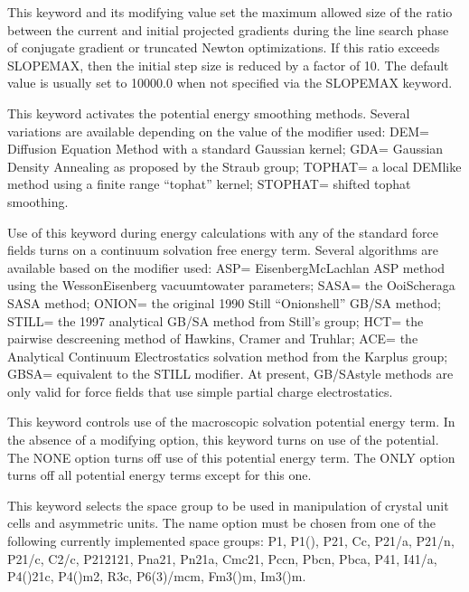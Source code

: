\documentclass[letterpaper,11pt,english]{sphinxmanual}
\begin{document}
  This keyword and its modifying value set the maximum allowed size of the ratio between the current and initial projected gradients during the line search phase of conjugate gradient or truncated Newton optimizations. If this ratio exceeds SLOPEMAX, then the initial step size is reduced by a factor of 10. The default value is usually set to 10000.0 when not specified via the SLOPEMAX keyword.

  This keyword activates the potential energy smoothing methods. Several variations are available depending on the value of the modifier used: DEM= Diffusion Equation Method with a standard Gaussian kernel; GDA= Gaussian Density Annealing as proposed by the Straub group; TOPHAT= a local DEM\sphinxhyphen{}like method using a finite range “tophat” kernel; STOPHAT= shifted tophat smoothing.

  Use of this keyword during energy calculations with any of the standard force fields turns on a continuum solvation free energy term. Several algorithms are available based on the modifier used: ASP= Eisenberg\sphinxhyphen{}McLachlan ASP method using the Wesson\sphinxhyphen{}Eisenberg vacuum\sphinxhyphen{}to\sphinxhyphen{}water parameters; SASA= the Ooi\sphinxhyphen{}Scheraga SASA method; ONION= the original 1990 Still “Onion\sphinxhyphen{}shell” GB/SA method; STILL= the 1997 analytical GB/SA method from Still’s group; HCT= the pairwise descreening method of Hawkins, Cramer and Truhlar; ACE= the Analytical Continuum Electrostatics solvation method from the Karplus group; GBSA= equivalent to the STILL modifier. At present, GB/SA\sphinxhyphen{}style methods are only valid for force fields that use simple partial charge electrostatics.

  This keyword controls use of the macroscopic solvation potential energy term. In the absence of a modifying option, this keyword turns on use of the potential. The NONE option turns off use of this potential energy term. The ONLY option turns off all potential energy terms except for this one.

  This keyword selects the space group to be used in manipulation of crystal unit cells and asymmetric units. The name option must be chosen from one of the following currently implemented space groups: P1, P1(\sphinxhyphen{}), P21, Cc, P21/a, P21/n, P21/c, C2/c, P212121, Pna21, Pn21a, Cmc21, Pccn, Pbcn, Pbca, P41, I41/a, P4(\sphinxhyphen{})21c, P4(\sphinxhyphen{})m2, R3c, P6(3)/mcm, Fm3(\sphinxhyphen{})m, Im3(\sphinxhyphen{})m.
\end{document}
